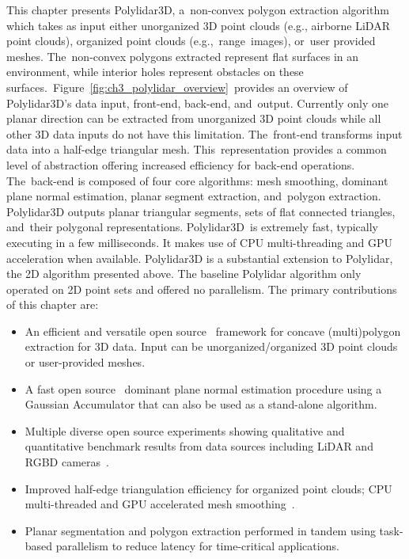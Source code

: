 This chapter presents Polylidar3D, a~non-convex polygon extraction algorithm which takes as input either unorganized 3D point clouds (e.g., airborne LiDAR point clouds), organized point clouds (e.g.,~range~images), or~user provided meshes. The~non-convex polygons extracted represent flat surfaces in an environment, while interior holes represent obstacles on these surfaces.~Figure~\ref{fig:ch3_polylidar_overview}~provides an overview of Polylidar3D's data input, front-end, back-end, and~output.  Currently only one planar direction can be extracted from unorganized 3D point clouds while all other 3D data inputs do not have this limitation. The~front-end transforms input data into a half-edge triangular mesh.  This~representation provides a common level of abstraction offering increased efficiency for back-end operations. The~back-end is composed of four core algorithms: mesh smoothing, dominant plane normal estimation, planar segment extraction, and~polygon extraction.  Polylidar3D outputs planar triangular segments, sets of flat connected triangles, and~their polygonal representations. Polylidar3D~is extremely fast, typically executing in a few milliseconds. It makes use of CPU multi-threading and GPU acceleration when available. Polylidar3D is a substantial extension to Polylidar, the 2D algorithm presented above. The baseline Polylidar algorithm only operated on 2D point sets and offered no parallelism. 
The primary contributions of this chapter are:

\begin{itemize}
  \item An efficient and versatile open source~\cite{Castagno_Github_Polylidar} framework for concave (multi)polygon extraction for 3D data. Input can be unorganized/organized 3D point clouds or user-provided meshes.
  \item A fast open source~\cite{Castagno_Github_fastga} dominant plane normal estimation procedure using a Gaussian Accumulator that can also be used as a stand-alone algorithm.
  \item Multiple diverse open source experiments showing qualitative and quantitative benchmark results from data sources including LiDAR and \ac{RGBD} cameras~\cite{Castagno_Github_Polylidar3D_Kitti, Castagno_Github_Polylidar3D_RealSense, Castagno_Github_Polylidar_Synpeb}.
  \item Improved half-edge triangulation efficiency for organized point clouds; CPU multi-threaded and GPU accelerated mesh smoothing~\cite{Castagno_Github_opf}. 
  \item Planar segmentation and polygon extraction performed in tandem using task-based parallelism to reduce latency for time-critical applications. 
\end{itemize}

